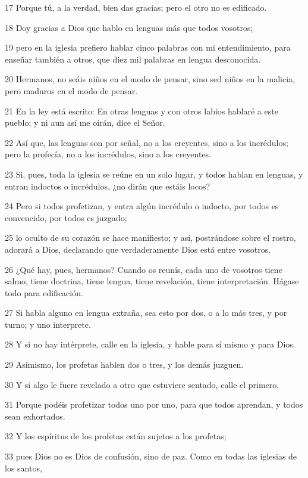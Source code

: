 \par 17 Porque tú, a la verdad, bien das gracias; pero el otro no es edificado.
\par 18 Doy gracias a Dios que hablo en lenguas más que todos vosotros;
\par 19 pero en la iglesia prefiero hablar cinco palabras con mi entendimiento, para enseñar también a otros, que diez mil palabras en lengua desconocida.
\par 20 Hermanos, no seáis niños en el modo de pensar, sino sed niños en la malicia, pero maduros en el modo de pensar.
\par 21 En la ley está escrito: En otras lenguas y con otros labios hablaré a este pueblo; y ni aun así me oirán, dice el Señor.
\par 22 Así que, las lenguas son por señal, no a los creyentes, sino a los incrédulos; pero la profecía, no a los incrédulos, sino a los creyentes.
\par 23 Si, pues, toda la iglesia se reúne en un solo lugar, y todos hablan en lenguas, y entran indoctos o incrédulos, ¿no dirán que estáis locos?
\par 24 Pero si todos profetizan, y entra algún incrédulo o indocto, por todos es convencido, por todos es juzgado;
\par 25 lo oculto de su corazón se hace manifiesto; y así, postrándose sobre el rostro, adorará a Dios, declarando que verdaderamente Dios está entre vosotros.
\par 26 ¿Qué hay, pues, hermanos? Cuando os reunís, cada uno de vosotros tiene salmo, tiene doctrina, tiene lengua, tiene revelación, tiene interpretación. Hágase todo para edificación.
\par 27 Si habla alguno en lengua extraña, sea esto por dos, o a lo más tres, y por turno; y uno interprete.
\par 28 Y si no hay intérprete, calle en la iglesia, y hable para sí mismo y para Dios.
\par 29 Asimismo, los profetas hablen dos o tres, y los demás juzguen.
\par 30 Y si algo le fuere revelado a otro que estuviere sentado, calle el primero.
\par 31 Porque podéis profetizar todos uno por uno, para que todos aprendan, y todos sean exhortados.
\par 32 Y los espíritus de los profetas están sujetos a los profetas;
\par 33 pues Dios no es Dios de confusión, sino de paz. Como en todas las iglesias de los santos,
